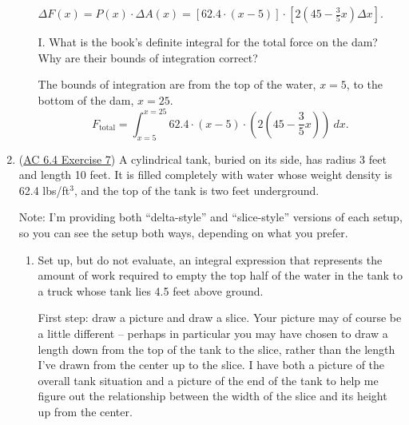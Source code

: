 \begin{enumerate}[leftmargin=0pt]
\begin{enumerate}
    \begin{red}
        $\Delta F(x) = P(x)\cdot \Delta A(x) = [62.4\cdot (x-5)]\cdot\left[2\left(45 - \tfrac35 x\right)\Delta x\right]. $
    \end{red}
    \item[I.] What is the book's definite integral for the total force on the dam? Why are their bounds of integration correct?

    \begin{red}
        The bounds of integration are from the top of the water, $x=5$, to the bottom of the dam, $x=25$.
        \[F_\text{total} = \displaystyle\int_{x=5}^{x=25} 62.4\cdot(x-5)\cdot\left(2\left(45 - \dfrac35 x\right)\right)\ dx. \]
    \end{red}
\end{enumerate}

\item (\href{https://activecalculus.org/single/sec-6-4-physics.html#wrN}{AC 6.4 Exercise 7}) A cylindrical tank, buried on its side, has radius 3 feet and length 10 feet. It is filled completely with water whose weight density is 62.4 lbs/ft$^3$, and the top of the tank is two feet underground.

\begin{red}
    Note: I'm providing both ``delta-style'' and ``slice-style'' versions of each setup, so you can see the setup both ways, depending on what you prefer.
\end{red}

\begin{enumerate}
    \item Set up, but do not evaluate, an integral expression that represents the amount of work required to empty the top half of the water in the tank to a truck whose tank lies 4.5 feet above ground.
    
    \begin{red}
    First step: draw a picture and draw a slice. Your picture may of course be a little different -- perhaps in particular you may have chosen to draw a length down from the top of the tank to the slice, rather than the length I've drawn from the center up to the slice. I have both a picture of the overall tank situation and a picture of the end of the tank to help me figure out the relationship between the width of the slice and its height up from the center.
    

\end{red}
\end{enumerate}
\end{enumerate}
